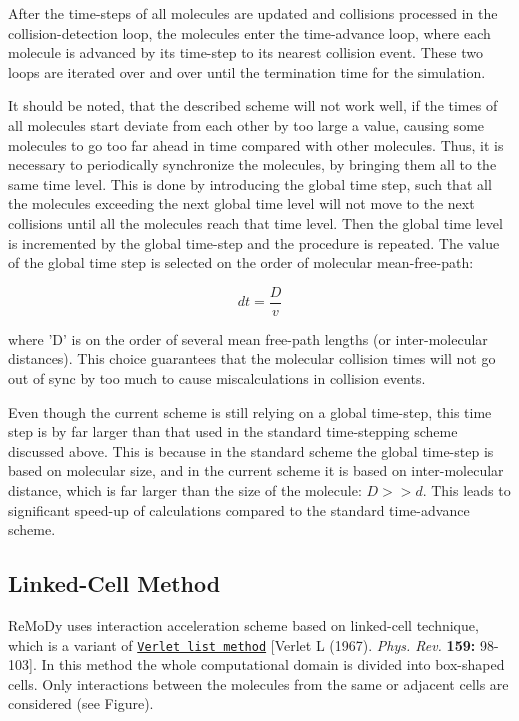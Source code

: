 After the time-steps of all molecules are updated and collisions processed in the collision-detection loop, the molecules enter the time-advance loop, where each molecule is advanced by its time-step to its nearest collision event. These two loops are iterated over and over until the termination time for the simulation.

It should be noted, that the described scheme will not work well, if the times of all molecules start deviate from each other by too large a value, causing some molecules to go too far ahead in time compared with other molecules. Thus, it is necessary to periodically synchronize the molecules, by bringing them all to the same time level. This is done by introducing the global time step, such that all the molecules exceeding the next global time level will not move to the next collisions until all the molecules reach that time level. Then the global time level is incremented by the global time-step and the procedure is repeated. The value of the global time step is selected on the order of molecular mean-free-path:

\[ dt = \frac{D}{v} \]

where 'D' is on the order of several mean free-path lengths (or inter-molecular distances). This choice guarantees that the molecular collision times will not go out of sync by too much to cause miscalculations in collision events.

Even though the current scheme is still relying on a global time-step, this time step is by far larger than that used in the standard time-stepping scheme discussed above. This is because in the standard scheme the global time-step is based on molecular size, and in the current scheme it is based on inter-molecular distance, which is far larger than the size of the molecule: $D >> d $. This leads to significant speed-up of calculations compared to the standard time-advance scheme.\hypertarget{Implementation_SLinkCell}{}\subsection{Linked-Cell Method}\label{Implementation_SLinkCell}
ReMoDy uses interaction acceleration scheme based on linked-cell technique, which is a variant of \href{http://en.wikipedia.org/wiki/Verlet_list}{\tt Verlet list method} \mbox{[}Verlet L (1967). {\em Phys. Rev.\/} {\bf 159:} 98-103\mbox{]}. In this method the whole computational domain is divided into box-shaped cells. Only interactions between the molecules from the same or adjacent cells are considered (see Figure).



